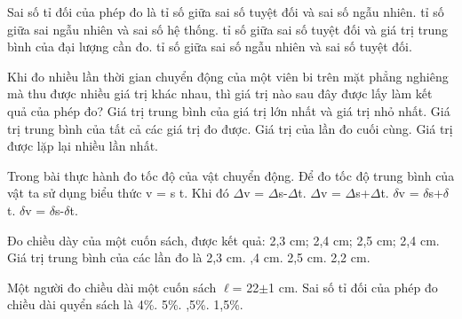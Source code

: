 \begin{ex}
Sai số tỉ đối của phép đo là
\choice
{tỉ số giữa sai số tuyệt đối và sai số ngẫu nhiên.}
{tỉ số giữa sai ngẫu nhiên và sai số hệ thống.}
{\True tỉ số giữa sai số tuyệt đối và giá trị trung bình của đại lượng cần đo.}
{tỉ số giữa sai số ngẫu nhiên và sai số tuyệt đối.}
\end{ex}

\begin{ex}
Khi đo nhiều lần thời gian chuyển động của một viên bi trên mặt phẳng
nghiêng mà thu được nhiều giá trị khác nhau, thì giá trị nào sau đây được lấy làm kết
quả của phép đo?
\choice
{Giá trị trung bình của giá trị lớn nhất và giá trị nhỏ nhất.}
{\True Giá trị trung bình của tất cả các giá trị đo được.}
{Giá trị của lần đo cuối cùng.}
{Giá trị được lặp lại nhiều lần nhất.}
\end{ex}

\begin{ex}
Trong bài thực hành đo tốc độ của vật chuyển động. Để đo tốc độ trung bình
của vật ta sử dụng biểu thức v = s
t. Khi đó
\choice
{$\Delta$v = $\Delta$s-$\Delta$t.}
{$\Delta$v = $\Delta$s+$\Delta$t.}
{\True $\delta$v = $\delta$s+$\delta$t.}
{$\delta$v = $\delta$s-$\delta$t.}
\end{ex}

\begin{ex}
Đo chiều dày của một cuốn sách, được kết quả: 2,3 cm; 2,4 cm; 2,5 cm; 2,4 cm.
Giá trị trung bình của các lần đo là
\choice
{2,3 cm.}
{,4 cm.}
{2,5 cm.}
{2,2 cm.}
\end{ex}

\begin{ex}
Một người đo chiều dài một cuốn sách $\ell$= 22$\pm$1 cm. Sai số tỉ đối của phép đo
chiều dài quyển sách là
\choice
{4\%.}
{5\%.}
{,5\%.}
{1,5\%.}
\end{ex}

